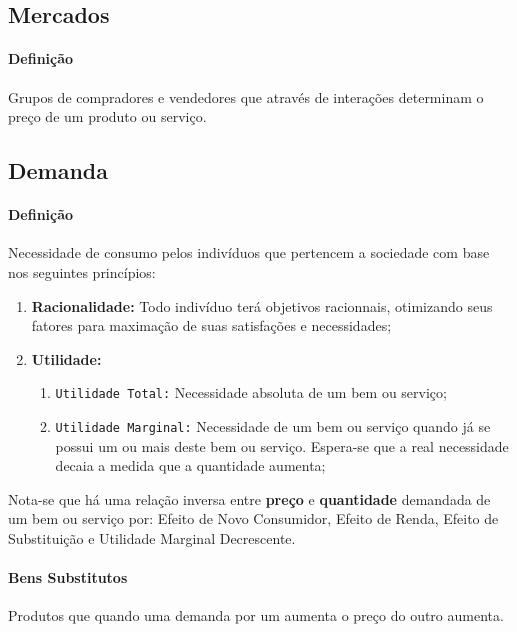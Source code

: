 \documentclass{article}
\begin{document}
    \subsection{Mercados}
        \paragraph{Definição}Grupos de compradores e vendedores que através de interações determinam o preço de um produto ou serviço.

    \subsection{Demanda}
        \paragraph{Definição}Necessidade de consumo pelos indivíduos que pertencem a sociedade com base nos seguintes princípios:
            \begin{enumerate}[rightmargin = \leftmargin]
                \item \textbf{Racionalidade:} Todo indivíduo terá objetivos racionnais, otimizando seus fatores para maximação de suas satisfações e necessidades;
                \item \textbf{Utilidade:}
                    \begin{enumerate}[noitemsep, rightmargin = \leftmargin]
                        \item \texttt{Utilidade Total:} Necessidade absoluta de um bem ou serviço;
                        \item \texttt{Utilidade Marginal:} Necessidade de um bem ou serviço quando já se possui um ou mais deste bem ou serviço. Espera-se que a real necessidade decaia a medida que a quantidade aumenta;
                    \end{enumerate}
            \end{enumerate}
        Nota-se que há uma relação inversa entre \textbf{preço} e \textbf{quantidade} demandada de um bem ou serviço por: Efeito de Novo Consumidor, Efeito de Renda, Efeito de Substituição e Utilidade Marginal Decrescente.

        \paragraph{Bens Substitutos}Produtos que quando uma demanda por um aumenta o preço do outro aumenta.
\end{document}
